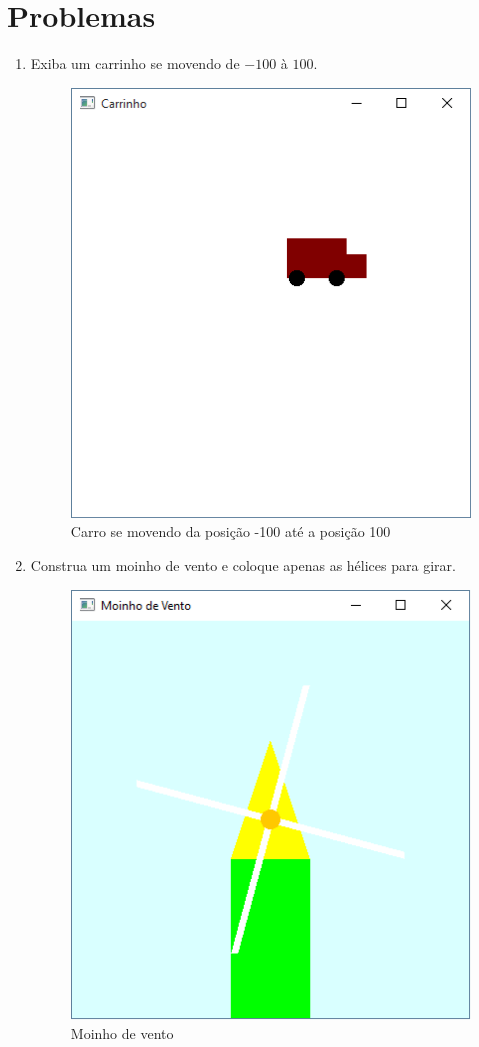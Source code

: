 \section*{Problemas}
\begin{enumerate}

\item
  Exiba um carrinho se movendo de $-100$ à $100$.
  \label{ex:cap01_ex6}

  \begin{figure}[H]
    \centerline{\includegraphics[width=.5\textwidth]{img/cap1_ex5.png}}
    \caption{Carro se movendo da posição -100 até a posição 100}
    \label{fig:cap01_ex6}
  \end{figure}

\item
  Construa um moinho de vento e coloque apenas as hélices para girar.
  \label{ex:cap01_ex7}

  \begin{figure}[H]
    \centerline{\includegraphics[width=.5\textwidth]{img/cap1_ex7.png}}
    \caption{Moinho de vento}
    \label{fig:cap01_ex7}
  \end{figure}


\end{enumerate}
